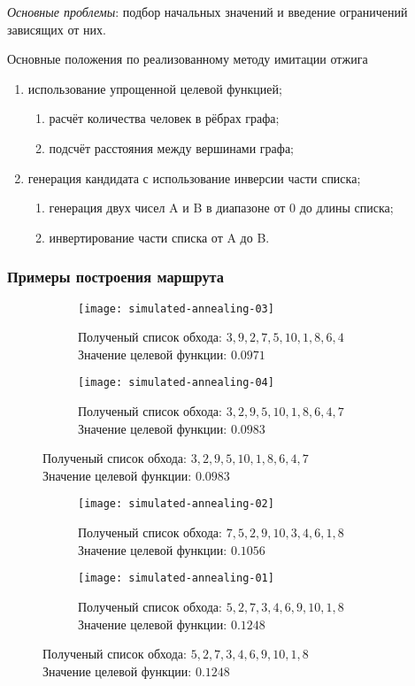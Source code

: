 \emph{Основные проблемы}: подбор начальных значений и введение ограничений зависящих от них.

Основные положения по реализованному методу имитации отжига
\begin{enumerate}
    \item использование упрощенной целевой функцией;
    \begin{enumerate}
        \item расчёт количества человек в рёбрах графа;
        \item подсчёт расстояния между вершинами графа;
    \end{enumerate}
    \item генерация кандидата с использование инверсии части списка;
    \begin{enumerate}
        \item генерация двух чисел A и B в диапазоне от 0 до длины списка;
        \item инвертирование части списка от A до B.
    \end{enumerate}
\end{enumerate}

\subsubsection{Примеры построения маршрута}
\begin{figure}[ht!]
    \centering
    \begin{subfigure}{0.47\textwidth}
        \texttt{[image: simulated-annealing-03]}
        \caption{Полученый список обхода: \( 3, 9, 2, 7, 5, 10, 1, 8, 6, 4 \)\\
            Значение целевой функции: \( 0.0971 \)}
    \end{subfigure}
    \begin{subfigure}{0.47\textwidth}
        \texttt{[image: simulated-annealing-04]}
        \caption{Полученый список обхода: \( 3, 2, 9, 5, 10, 1, 8, 6, 4, 7 \)\\
            Значение целевой функции: \( 0.0983 \)}
    \end{subfigure}
\end{figure}
\begin{figure}[ht!]
    \centering
    \begin{subfigure}{0.47\textwidth}
        \texttt{[image: simulated-annealing-02]}
        \caption{Полученый список обхода: \( 7, 5, 2, 9, 10, 3, 4, 6, 1, 8 \)\\
            Значение целевой функции: \( 0.1056 \)}
    \end{subfigure}
    \begin{subfigure}{0.47\textwidth}
        \texttt{[image: simulated-annealing-01]}
        \caption{Полученый список обхода: \( 5, 2, 7, 3, 4, 6, 9, 10, 1, 8 \)\\
            Значение целевой функции: \( 0.1248 \)}
    \end{subfigure}
\end{figure}

